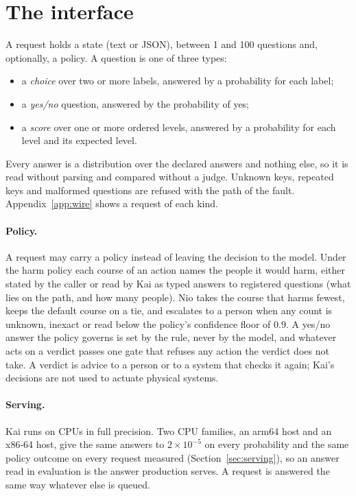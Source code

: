 \section{The interface}
\label{sec:interface}

A request holds a state (text or JSON), between 1 and 100 questions and,
optionally, a policy. A question is one of three types:
\begin{itemize}[leftmargin=1.5em]
  \item a \emph{choice} over two or more labels, answered by a probability for
    each label;
  \item a \emph{yes/no} question, answered by the probability of yes;
  \item a \emph{score} over one or more ordered levels, answered by a
    probability for each level and its expected level.
\end{itemize}
Every answer is a distribution over the declared answers and nothing else, so
it is read without parsing and compared without a judge. Unknown keys,
repeated keys and malformed questions are refused with the path of the fault.
Appendix~\ref{app:wire} shows a request of each kind.

\paragraph{Policy.} A request may carry a policy instead of leaving the
decision to the model. Under the harm policy each course of an action names
the people it would harm, either stated by the caller or read by Kai as typed
answers to registered questions (what lies on the path, and how many people).
Nio takes the course that harms fewest, keeps the default course on a tie, and
escalates to a person when any count is unknown, inexact or read below the
policy's confidence floor of 0.9. A yes/no answer the policy governs is set by
the rule, never by the model, and whatever acts on a verdict passes one gate
that refuses any action the verdict does not take. A verdict is advice to a
person or to a system that checks it again; Kai's decisions are not used to
actuate physical systems.

\paragraph{Serving.} Kai runs on CPUs in full precision. Two CPU families, an
arm64 host and an x86-64 host, give the same answers to $2\times10^{-5}$ on
every probability and the same policy outcome on every request measured
(Section~\ref{sec:serving}), so an answer read in evaluation is the answer
production serves. A request is answered the same way whatever else is
queued.

